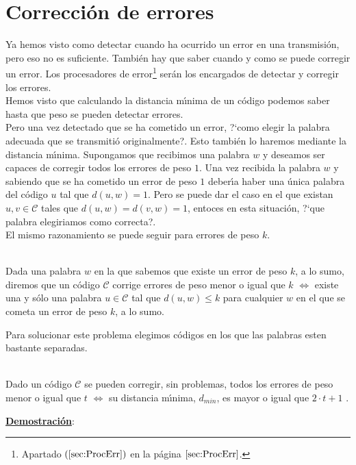\section{Correcci\'on de errores}

Ya hemos visto como detectar cuando ha ocurrido un error en una transmisi\'on,
pero eso no es suficiente. Tambi\'en hay que saber cuando y como se puede
corregir un error. Los procesadores de error\footnote{Apartado
$(\ref{sec:ProcErr})$ en la p\'agina $\pageref{sec:ProcErr}$.} ser\'an los
encargados de detectar y corregir los errores.\\

Hemos visto que calculando la distancia m\'{\i}nima de un c\'odigo podemos
saber hasta que peso se pueden detectar errores.\\

Pero una vez detectado que se ha cometido un error, ?`como elegir la palabra
adecuada que se transmiti\'o originalmente?. Esto tambi\'en lo haremos mediante
la distancia m\'{\i}nima.
%
\newpage
%
Supongamos que recibimos una palabra $w$ y deseamos ser capaces de corregir
todos los errores de peso $1$. Una vez recibida la palabra $w$ y sabiendo que
se ha cometido un error de peso $1$ deber\'{\i}a haber una \'unica palabra
del c\'odigo $u$ tal que $d(u,w)=1$. Pero se puede dar el caso en el que existan
$u,v\in \mathcal{C}$ tales que $d(u,w)=d(v,w)=1$, entoces en esta situaci\'on,
?`que palabra elegiriamos como correcta?.\\

El mismo razonamiento se puede seguir para errores de peso $k$.
\begin{definicion}
\ \\
Dada una palabra $w$ en la que sabemos que existe un error de peso $k$, a lo
sumo, diremos que un c\'odigo $\mathcal{C}$ corrige errores de peso menor o
igual que $k$ $\Longleftrightarrow$ existe una y s\'olo una palabra $u\in
\mathcal{C}$ tal que $d(u,w)\leq k$ para cualquier $w$ en el que se cometa un
error de peso $k$, a lo sumo.
\end{definicion}

Para solucionar este problema elegimos c\'odigos en los que las palabras esten
bastante separadas.

\begin{teorema}\label{the:Correccion}
\ \\
Dado un c\'odigo $\mathcal{C}$ se pueden corregir, sin problemas, todos los
errores de peso menor o igual que $t$ $\Longleftrightarrow$ su distancia
m\'{\i}nima, $d_{min}$, es mayor o igual que $2\cdot t +1$ .
\end{teorema}
\underline{\textbf{Demostraci\'on}}:

